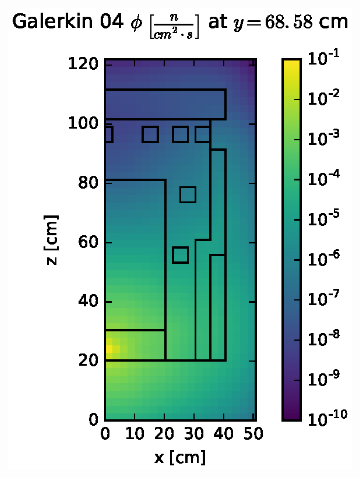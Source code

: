 \begin{figure}[!htb]
\begin{subfigure}{0.4\textwidth}
\includegraphics[max height=0.445\textheight]
{img/dlvn-plots/fwd/flux-gkn04-slice.eps}
\end{subfigure}
\\
\begin{subfigure}{0.4\textwidth}

\end{subfigure}
\end{figure}
